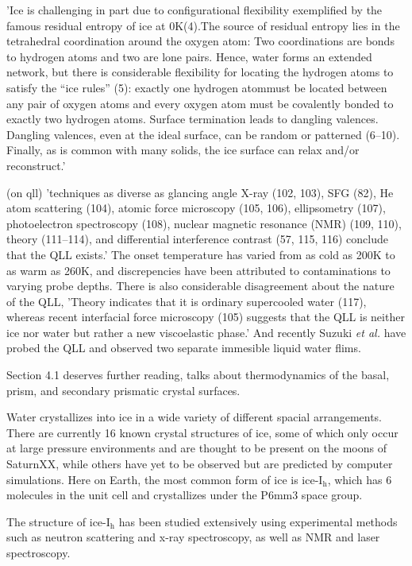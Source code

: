 'Ice is challenging in part due to configurational flexibility
exemplified by the famous residual entropy of ice at 0K(4).The source
of residual entropy lies in the tetrahedral coordination around the
oxygen atom: Two coordinations are bonds to hydrogen atoms and two are
lone pairs. Hence, water forms an extended network, but there is
considerable flexibility for locating the hydrogen atoms to satisfy
the “ice rules” (5): exactly one hydrogen atommust be located between
any pair of oxygen atoms and every oxygen atom must be covalently
bonded to exactly two hydrogen atoms. Surface termination leads to
dangling valences. Dangling valences, even at the ideal surface, can
be random or patterned (6–10). Finally, as is common with many solids,
the ice surface can relax and/or reconstruct.'

(on qll) 'techniques as diverse as glancing angle X-ray (102, 103),
SFG (82), He atom scattering (104), atomic force microscopy (105,
106), ellipsometry (107), photoelectron spectroscopy (108), nuclear
magnetic resonance (NMR) (109, 110), theory (111–114), and
differential interference contrast (57, 115, 116) conclude that the
QLL exists.' The onset temperature has varied from as cold as 200K to
as warm as 260K, and discrepencies have been attributed to
contaminations to varying probe depths. There is also considerable
disagreement about the nature of the QLL, 'Theory indicates that it is
ordinary supercooled water (117), whereas recent interfacial force
microscopy (105) suggests that the QLL is neither ice nor water but
rather a new viscoelastic phase.' And recently Suzuki \textit{et al.}
have probed the QLL and observed two separate immesible liquid water
flims. 

Section 4.1 deserves further reading, talks about thermodynamics of
the basal, prism, and secondary prismatic crystal surfaces.

Water crystallizes into ice in a wide variety of different spacial
arrangements. There are currently 16 known crystal structures of ice,
some of which only occur at large pressure environments and are
thought to be present on the moons of SaturnXX, while others have yet
to be observed but are predicted by computer simulations. Here on
Earth, the most common form of ice is ice-I$_\mathrm{h}$, which has 6
molecules in the unit cell and crystallizes under the P6mm3 space
group.

The structure of ice-I$_\mathrm{h}$ has been studied extensively using
experimental methods such as neutron scattering and x-ray
spectroscopy, as well as NMR and laser spectroscopy.\cite{w. F. Kuhs
  and M. S. Lehmann, in Water Science Reviews 2, edited by F. Franks
  (Cambridge University, New York, 1986),pp. 1-65.} 

